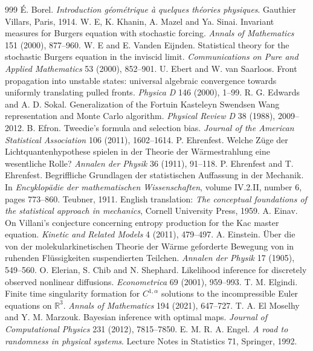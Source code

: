 \begin{thebibliography}{999}
 \'E. Borel. \emph{Introduction g\'eom\'etrique \`a quelques th\'eories physiques}. Gauthier Villars, Paris, 1914.
 W. E, K. Khanin, A. Mazel and Ya. Sinai. Invariant measures for Burgers equation with stochastic forcing. \emph{Annals of Mathematics} 151 (2000), 877--960.
 W. E and E. Vanden Eijnden. Statistical theory for the stochastic Burgers equation in the inviscid limit. \emph{Communications on Pure and Applied Mathematics} 53 (2000), 852--901.
 U. Ebert and W. van Saarloos. Front propagation into unstable states: universal algebraic convergence towards uniformly translating pulled fronts. \emph{Physica D} 146 (2000), 1--99.
 R. G. Edwards and A. D. Sokal. Generalization of the Fortuin Kasteleyn Swendsen Wang representation and Monte Carlo algorithm. \emph{Physical Review D} 38 (1988), 2009--2012.
 B. Efron. Tweedie's formula and selection bias. \emph{Journal of the American Statistical Association} 106 (2011), 1602--1614.
 P. Ehrenfest. Welche Z\"uge der Lichtquantenhypothese spielen in der Theorie der W\"armestrahlung eine wesentliche Rolle? \emph{Annalen der Physik} 36 (1911), 91--118.
 P. Ehrenfest and T. Ehrenfest. Begriffliche Grundlagen der statistischen Auffassung in der Mechanik. In \emph{Encyklop\"adie der mathematischen Wissenschaften}, volume IV.2.II, number 6, pages 773--860. Teubner, 1911. English translation: \emph{The conceptual foundations of the statistical approach in mechanics}, Cornell University Press, 1959.
 A. Einav. On Villani's conjecture concerning entropy production for the Kac master equation. \emph{Kinetic and Related Models} 4 (2011), 479--497.
 A. Einstein. \"Uber die von der molekularkinetischen Theorie der W\"arme geforderte Bewegung von in ruhenden Fl\"ussigkeiten suspendierten Teilchen. \emph{Annalen der Physik} 17 (1905), 549--560.
 O. Elerian, S. Chib and N. Shephard. Likelihood inference for discretely observed nonlinear diffusions. \emph{Econometrica} 69 (2001), 959--993.
 T. M. Elgindi. Finite time singularity formation for $C^{1,\alpha}$ solutions to the incompressible Euler equations on $\mathbb{R}^3$. \emph{Annals of Mathematics} 194 (2021), 647--727.
 T. A. El Moselhy and Y. M. Marzouk. Bayesian inference with optimal maps. \emph{Journal of Computational Physics} 231 (2012), 7815--7850.
 E. M. R. A. Engel. \emph{A road to randomness in physical systems}. Lecture Notes in Statistics 71, Springer, 1992.

\end{thebibliography}
